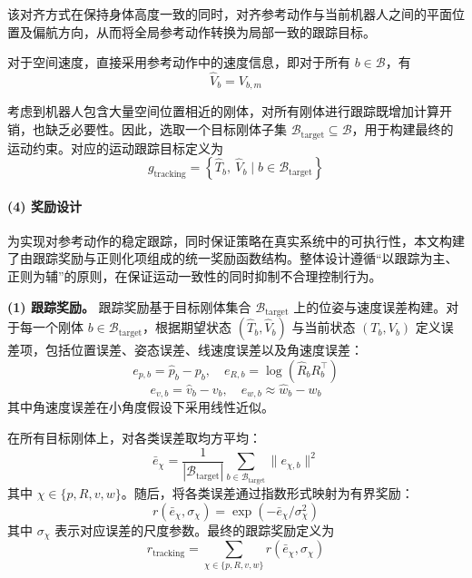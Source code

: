该对齐方式在保持身体高度一致的同时，对齐参考动作与当前机器人之间的平面位置及偏航方向，从而将全局参考动作转换为局部一致的跟踪目标。

对于空间速度，直接采用参考动作中的速度信息，即对于所有 $b \in \mathcal{B}$，有
\begin{equation}
	\hat{V}_b = V_{b,m}
\end{equation}

考虑到机器人包含大量空间位置相近的刚体，对所有刚体进行跟踪既增加计算开销，也缺乏必要性。因此，选取一个目标刚体子集 $\mathcal{B}_{\text{target}} \subseteq \mathcal{B}$，用于构建最终的运动约束。对应的运动跟踪目标定义为
\begin{equation}
	g_{\text{tracking}} = \left\{ \hat{T}_b,\ \hat{V}_b \mid b \in \mathcal{B}_{\text{target}} \right\}
\end{equation}


\paragraph{(4) 奖励设计}

为实现对参考动作的稳定跟踪，同时保证策略在真实系统中的可执行性，本文构建了由跟踪奖励与正则化项组成的统一奖励函数结构。整体设计遵循“以跟踪为主、正则为辅”的原则，在保证运动一致性的同时抑制不合理控制行为。

\textbf{(1) 跟踪奖励。}
跟踪奖励基于目标刚体集合 $\mathcal{B}_{\text{target}}$ 上的位姿与速度误差构建。对于每一个刚体 $b \in \mathcal{B}_{\text{target}}$，根据期望状态 $(\hat{T}_b, \hat{V}_b)$ 与当前状态 $(T_b, V_b)$ 定义误差项，包括位置误差、姿态误差、线速度误差以及角速度误差：
\begin{equation}
	e_{p,b} = \hat{p}_b - p_b, \quad
	e_{R,b} = \log(\hat{R}_b R_b^\top)
\end{equation}
\begin{equation}
	e_{v,b} = \hat{v}_b - v_b, \quad
	e_{w,b} \approx \hat{w}_b - w_b
\end{equation}
其中角速度误差在小角度假设下采用线性近似。

在所有目标刚体上，对各类误差取均方平均：
\begin{equation}
	\bar{e}_\chi = \frac{1}{|\mathcal{B}_{\text{target}}|} \sum_{b \in \mathcal{B}_{\text{target}}} \| e_{\chi,b} \|^2
\end{equation}
其中 $\chi \in \{p, R, v, w\}$。随后，将各类误差通过指数形式映射为有界奖励：
\begin{equation}
	r(\bar{e}_\chi, \sigma_\chi) = \exp\!\left(-\bar{e}_\chi / \sigma_\chi^2\right)
\end{equation}
其中 $\sigma_\chi$ 表示对应误差的尺度参数。最终的跟踪奖励定义为
\begin{equation}
	r_{\text{tracking}} = \sum_{\chi \in \{p, R, v, w\}} r(\bar{e}_\chi, \sigma_\chi)
\end{equation}

